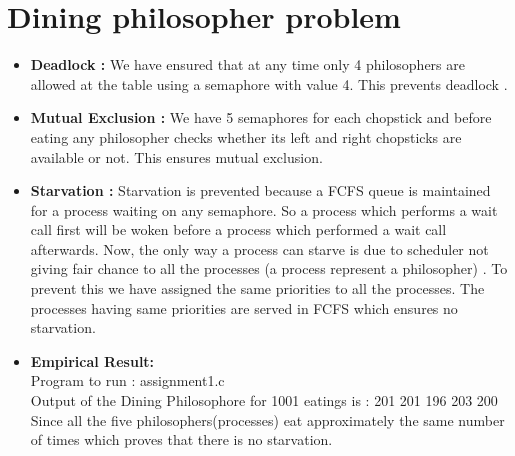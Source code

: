 \documentclass{article}
\begin{document}
\section*{Dining philosopher problem}
\begin{itemize}
\item \textbf{Deadlock :} We have ensured that at any time only 4 philosophers are allowed at the table using a semaphore with value 4. This prevents deadlock . 
\item \textbf{Mutual Exclusion :} We have 5 semaphores for each chopstick and before eating any philosopher checks whether its left and right chopsticks are available or not. This ensures mutual exclusion. 
\item \textbf{Starvation :} Starvation is prevented because a FCFS queue is maintained for a process waiting on any semaphore. So a process which performs a wait call first will be woken before a  process which performed a wait call afterwards. Now, the only way a process can starve is due to scheduler not giving fair chance to all the processes (a process represent a philosopher) . To prevent this we have assigned the same priorities to all the processes. The processes having same priorities are served in FCFS which ensures no starvation.
\item \textbf{Empirical Result:} 
\\ Program to run : assignment1.c
\\ Output of the Dining Philosophore for 1001 eatings is : 201 201 196 203 200
\\ Since all the five philosophers(processes) eat approximately the same number of times which proves that there is no starvation.

\end{itemize}

\section*{}
\end{document}
